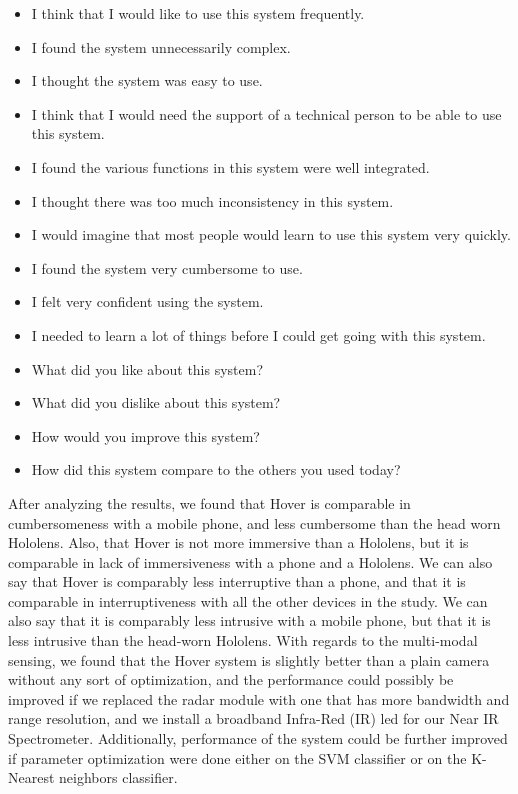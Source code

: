 \begin{itemize}
    \item I think that I would like to use this system frequently. 
    \item I found the system unnecessarily complex.
    \item I thought the system was easy to use.
    \item I think that I would need the support of a technical person to be able to use this system.
    \item I found the various functions in this system were well integrated.	
    \item I thought there was too much inconsistency in this system.
    \item I would imagine that most people would learn to use this system very quickly.
    \item I found the system very cumbersome to use.
    \item I felt very confident using the system.	
    \item I needed to learn a lot of things before I could get going with this system.	
    \item What did you like about this system?	
    \item What did you dislike about this system?	
    \item How would you improve this system?
    \item How did this system compare to the others you used today?	
\end{itemize}
 

After analyzing the results, we found that Hover is comparable in cumbersomeness with a mobile phone, and less cumbersome than the head worn Hololens. Also, that Hover is not more immersive than a Hololens, but it is comparable in lack of immersiveness with a phone and a Hololens. We can also say that Hover is comparably less interruptive than a phone, and that it is comparable in interruptiveness with all the other devices in the study. We can also say that it is comparably less intrusive with a mobile phone, but that it is less intrusive than the head-worn Hololens. With regards to the multi-modal sensing, we found that the Hover system is slightly better than a plain camera without any sort of optimization, and the performance could possibly be improved if we replaced the radar module with one that has more bandwidth and range resolution, and we install a broadband Infra-Red (IR) led for our Near IR Spectrometer. Additionally, performance of the system could be further improved if parameter optimization were done either on the SVM classifier or on the K-Nearest neighbors classifier. 




